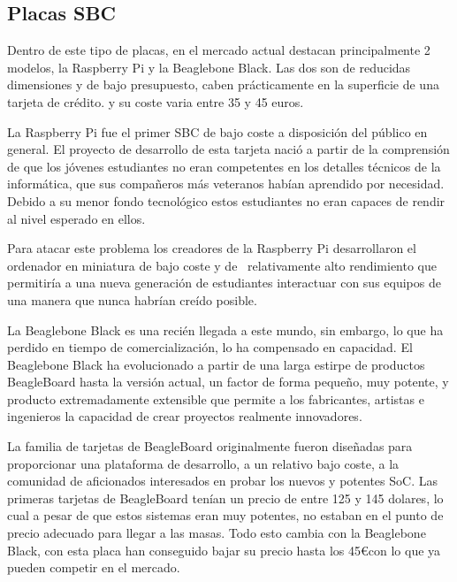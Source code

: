 \subsection{Placas SBC}
Dentro de este tipo de placas, en el mercado actual destacan principalmente 2 modelos, la Raspberry Pi y la Beaglebone Black. Las dos son de reducidas dimensiones y de bajo presupuesto, caben prácticamente en la superficie de una tarjeta de crédito. y su coste varia entre 35 y 45 euros.



La Raspberry Pi fue el primer SBC de bajo coste a disposición del público en general. El proyecto de desarrollo de esta tarjeta nació a partir de la comprensión de que los jóvenes estudiantes no eran competentes en los detalles técnicos de la informática, que sus compañeros más veteranos habían aprendido por necesidad. Debido a su menor fondo tecnológico estos estudiantes no eran capaces de rendir al nivel esperado en ellos.



Para atacar este problema los creadores de la Raspberry Pi desarrollaron el ordenador en miniatura de bajo coste y de \ relativamente alto rendimiento que permitiría a una nueva generación de estudiantes interactuar con sus equipos de una manera que nunca habrían creído posible.



La Beaglebone Black es una recién llegada a este mundo, sin embargo, lo que ha perdido en tiempo de comercialización, lo ha compensado en capacidad. El Beaglebone Black ha evolucionado a partir de una larga estirpe de productos BeagleBoard hasta la versión actual, un factor de forma pequeño, muy potente, y producto extremadamente extensible que permite a los fabricantes, artistas e ingenieros la capacidad de crear proyectos realmente innovadores.



La familia de tarjetas de BeagleBoard originalmente fueron diseñadas para proporcionar una plataforma de desarrollo, a un relativo bajo coste, a la comunidad de aficionados interesados en probar los nuevos y potentes SoC. Las primeras tarjetas de BeagleBoard tenían un precio de entre 125 y 145 dolares, lo cual a pesar de que estos sistemas eran muy potentes, no estaban en el punto de precio adecuado para llegar a las masas. Todo esto cambia con la Beaglebone Black, con esta placa han conseguido bajar su precio hasta los 45\euro con lo que ya pueden competir en el mercado.



